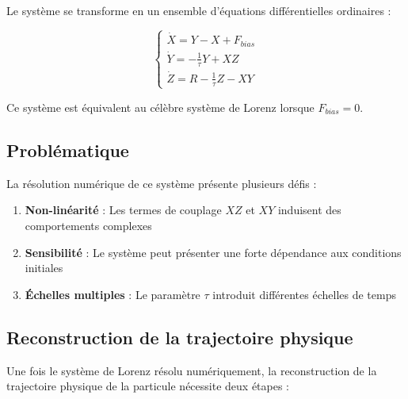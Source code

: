 Le système se transforme en un ensemble d'équations différentielles ordinaires :

\begin{equation}
\begin{cases}
\dot{X} = Y - X + F_{bias} \\
\dot{Y} = -\frac{1}{\tau} Y + XZ \\
\dot{Z} = R - \frac{1}{\tau} Z - XY
\end{cases}
\label{eq:lorenz_system}
\end{equation}

Ce système est équivalent au célèbre système de Lorenz lorsque $F_{bias} = 0$.

\subsection{Problématique}
La résolution numérique de ce système présente plusieurs défis :

\begin{enumerate}
    \item \textbf{Non-linéarité} : Les termes de couplage $XZ$ et $XY$ induisent des comportements complexes
    \item \textbf{Sensibilité} : Le système peut présenter une forte dépendance aux conditions initiales
    \item \textbf{Échelles multiples} : Le paramètre $\tau$ introduit différentes échelles de temps
\end{enumerate}

\subsection{Reconstruction de la trajectoire physique}
Une fois le système de Lorenz résolu numériquement, la reconstruction de la trajectoire physique de la particule nécessite deux étapes :

